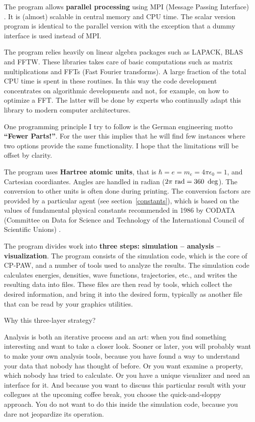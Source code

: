 \documentclass[final,12pt]{article}
\begin{document}
The program allows {\bf parallel processing} using MPI (Message
Passing Interface) \cite{mpi}. It is (almost) scalable in central
memory and CPU time.  The scalar version program is identical to the
parallel version with the exception that a dummy interface is used
instead of MPI.

The program relies heavily on linear algebra packages such as LAPACK,
BLAS and FFTW. These libraries takes care of basic computations such
as matrix multiplications and FFTs (Fast Fourier transforms). A large
fraction of the total CPU time is spent in these routines. In this way
the code development concentrates on algorithmic developments and not,
for example, on how to optimize a FFT.  The latter will be done by
experts who continually adapt this library to modern computer
architectures.

One programming principle I try to follow is the German engineering
motto {\bf ``Fewer Parts!''}. For the user this implies that he will
find few instances where two options provide the same functionality. I
hope that the limitations will be offset by clarity.

The program uses {\bf Hartree atomic units}, that is
$\hbar=e=m_e=4\pi\epsilon_0=1$, and Cartesian coordiantes.  Angles are
handled in radian ($2\pi{\rm\ rad}= 360~\deg$).  The conversion to
other units is often done during printing. The conversion factors are
provided by a particular agent (see section~\ref{constants}), which is
based on the values of fundamental physical constants recommended in
1986 by CODATA (Committee on Data for Science and Technology of the
International Council of Scientific Unions) \cite{mohr00_rmp72_351}.

The program divides work into {\bf three steps: simulation --
  analysis -- visualization}.  The program consists of the simulation
code, which is the core of CP-PAW, and a number of tools used to
analyze the results.  The simulation code calculates energies,
densities, wave functions, trajectories, etc., and writes the
resulting data into files.  These files are then read by tools, which
collect the desired information, and bring it into the desired
form, typically as another file that can be read by your graphics
utilities.

Why this three-layer strategy?

Analysis is both an iterative process and an art: when you find something
interesting and want to take a closer look. Sooner or later, you will
probably want to make your own analysis tools, because you have found a way
to understand your data that nobody has thought of before. Or you
want examine a property, which nobody has tried to calculate. Or
you have a unique visualizer and need an interface for it.  And
because you want to discuss this particular result with your collegues
at the upcoming coffee break, you choose the quick-and-sloppy
approach.  You do not want to do this inside the simulation code,
because you dare not jeopardize its operation.
\end{document}
